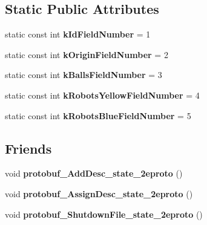 \subsection*{Static Public Attributes}
\begin{DoxyCompactItemize}
\item 
static const int {\bfseries k\+Id\+Field\+Number} = 1\hypertarget{classvss__state_1_1Global__State_adc3acf2d9111dd7e0e442b1c8f8743ab}{}\label{classvss__state_1_1Global__State_adc3acf2d9111dd7e0e442b1c8f8743ab}

\item 
static const int {\bfseries k\+Origin\+Field\+Number} = 2\hypertarget{classvss__state_1_1Global__State_a124e80222f404a8607d383c6b626b98a}{}\label{classvss__state_1_1Global__State_a124e80222f404a8607d383c6b626b98a}

\item 
static const int {\bfseries k\+Balls\+Field\+Number} = 3\hypertarget{classvss__state_1_1Global__State_a7ccc5ad24ae6460151ee94fd5f3800f5}{}\label{classvss__state_1_1Global__State_a7ccc5ad24ae6460151ee94fd5f3800f5}

\item 
static const int {\bfseries k\+Robots\+Yellow\+Field\+Number} = 4\hypertarget{classvss__state_1_1Global__State_a3dbd17117a81ad417c69ca945668edaa}{}\label{classvss__state_1_1Global__State_a3dbd17117a81ad417c69ca945668edaa}

\item 
static const int {\bfseries k\+Robots\+Blue\+Field\+Number} = 5\hypertarget{classvss__state_1_1Global__State_a69fd6df3aa2671364cb92838e3824e81}{}\label{classvss__state_1_1Global__State_a69fd6df3aa2671364cb92838e3824e81}

\end{DoxyCompactItemize}
\subsection*{Friends}
\begin{DoxyCompactItemize}
\item 
void {\bfseries protobuf\+\_\+\+Add\+Desc\+\_\+state\+\_\+2eproto} ()\hypertarget{classvss__state_1_1Global__State_aab1a2c258f8122a403a979ff57e2a706}{}\label{classvss__state_1_1Global__State_aab1a2c258f8122a403a979ff57e2a706}

\item 
void {\bfseries protobuf\+\_\+\+Assign\+Desc\+\_\+state\+\_\+2eproto} ()\hypertarget{classvss__state_1_1Global__State_a57d9367bc8a7a94ead11d11194cca1b6}{}\label{classvss__state_1_1Global__State_a57d9367bc8a7a94ead11d11194cca1b6}

\item 
void {\bfseries protobuf\+\_\+\+Shutdown\+File\+\_\+state\+\_\+2eproto} ()\hypertarget{classvss__state_1_1Global__State_a4e6dc5e8e72799859c4e9556d090e57d}{}\label{classvss__state_1_1Global__State_a4e6dc5e8e72799859c4e9556d090e57d}

\end{DoxyCompactItemize}



